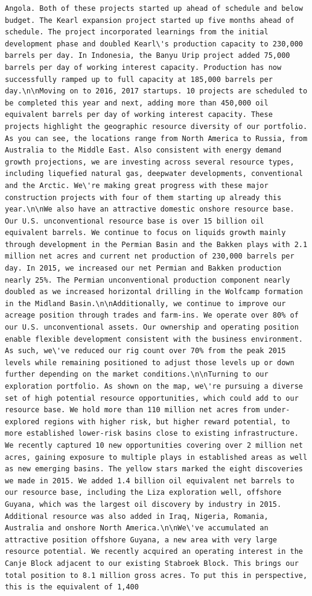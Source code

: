 \documentclass[
  letterpaper,
  DIV=11,
  numbers=noendperiod]{scrreprt}
\begin{document}
\begin{verbatim}
Angola. Both of these projects started up ahead of schedule and below budget. The Kearl expansion project started up five months ahead of schedule. The project incorporated learnings from the initial development phase and doubled Kearl\'s production capacity to 230,000 barrels per day. In Indonesia, the Banyu Urip project added 75,000 barrels per day of working interest capacity. Production has now successfully ramped up to full capacity at 185,000 barrels per day.\n\nMoving on to 2016, 2017 startups. 10 projects are scheduled to be completed this year and next, adding more than 450,000 oil equivalent barrels per day of working interest capacity. These projects highlight the geographic resource diversity of our portfolio. As you can see, the locations range from North America to Russia, from Australia to the Middle East. Also consistent with energy demand growth projections, we are investing across several resource types, including liquefied natural gas, deepwater developments, conventional and the Arctic. We\'re making great progress with these major construction projects with four of them starting up already this year.\n\nWe also have an attractive domestic onshore resource base. Our U.S. unconventional resource base is over 15 billion oil equivalent barrels. We continue to focus on liquids growth mainly through development in the Permian Basin and the Bakken plays with 2.1 million net acres and current net production of 230,000 barrels per day. In 2015, we increased our net Permian and Bakken production nearly 25%. The Permian unconventional production component nearly doubled as we increased horizontal drilling in the Wolfcamp formation in the Midland Basin.\n\nAdditionally, we continue to improve our acreage position through trades and farm-ins. We operate over 80% of our U.S. unconventional assets. Our ownership and operating position enable flexible development consistent with the business environment. As such, we\'ve reduced our rig count over 70% from the peak 2015 levels while remaining positioned to adjust those levels up or down further depending on the market conditions.\n\nTurning to our exploration portfolio. As shown on the map, we\'re pursuing a diverse set of high potential resource opportunities, which could add to our resource base. We hold more than 110 million net acres from under-explored regions with higher risk, but higher reward potential, to more established lower-risk basins close to existing infrastructure. We recently captured 10 new opportunities covering over 2 million net acres, gaining exposure to multiple plays in established areas as well as new emerging basins. The yellow stars marked the eight discoveries we made in 2015. We added 1.4 billion oil equivalent net barrels to our resource base, including the Liza exploration well, offshore Guyana, which was the largest oil discovery by industry in 2015. Additional resource was also added in Iraq, Nigeria, Romania, Australia and onshore North America.\n\nWe\'ve accumulated an attractive position offshore Guyana, a new area with very large resource potential. We recently acquired an operating interest in the Canje Block adjacent to our existing Stabroek Block. This brings our total position to 8.1 million gross acres. To put this in perspective, this is the equivalent of 1,400 
\end{verbatim}
\end{document}
